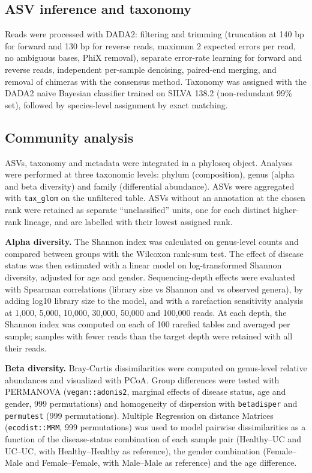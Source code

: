 \documentclass[
  letterpaper,
  DIV=11,
  numbers=noendperiod]{scrartcl}
\begin{document}
\subsection{ASV inference and
taxonomy}\label{asv-inference-and-taxonomy}

Reads were processed with DADA2: filtering and trimming (truncation at
140 bp for forward and 130 bp for reverse reads, maximum 2 expected
errors per read, no ambiguous bases, PhiX removal), separate error-rate
learning for forward and reverse reads, independent per-sample
denoising, paired-end merging, and removal of chimeras with the
consensus method. Taxonomy was assigned with the DADA2 naive Bayesian
classifier trained on SILVA 138.2 (non-redundant 99\% set), followed by
species-level assignment by exact matching.

\subsection{Community analysis}\label{community-analysis}

ASVs, taxonomy and metadata were integrated in a phyloseq object.
Analyses were performed at three taxonomic levels: phylum (composition),
genus (alpha and beta diversity) and family (differential abundance).
ASVs were aggregated with \texttt{tax\_glom} on the unfiltered table.
ASVs without an annotation at the chosen rank were retained as separate
``unclassified'' units, one for each distinct higher-rank lineage, and
are labelled with their lowest assigned rank.

\textbf{Alpha diversity.} The Shannon index was calculated on
genus-level counts and compared between groups with the Wilcoxon
rank-sum test. The effect of disease status was then estimated with a
linear model on log-transformed Shannon diversity, adjusted for age and
gender. Sequencing-depth effects were evaluated with Spearman
correlations (library size vs Shannon and vs observed genera), by adding
log10 library size to the model, and with a rarefaction sensitivity
analysis at 1,000, 5,000, 10,000, 30,000, 50,000 and 100,000 reads. At
each depth, the Shannon index was computed on each of 100 rarefied
tables and averaged per sample; samples with fewer reads than the target
depth were retained with all their reads.

\textbf{Beta diversity.} Bray-Curtis dissimilarities were computed on
genus-level relative abundances and visualized with PCoA. Group
differences were tested with PERMANOVA (\texttt{vegan::adonis2},
marginal effects of disease status, age and gender, 999 permutations)
and homogeneity of dispersion with \texttt{betadisper} and
\texttt{permutest} (999 permutations). Multiple Regression on distance
Matrices (\texttt{ecodist::MRM}, 999 permutations) was used to model
pairwise dissimilarities as a function of the disease-status combination
of each sample pair (Healthy--UC and UC--UC, with Healthy--Healthy as
reference), the gender combination (Female--Male and Female--Female,
with Male--Male as reference) and the age difference.
\end{document}
